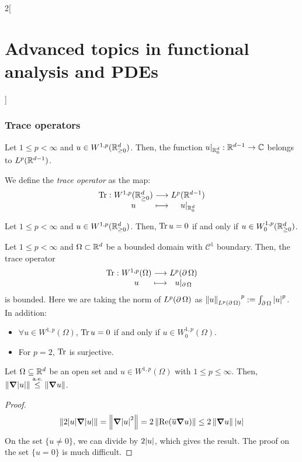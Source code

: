 \documentclass[../../../main_math.tex]{subfiles}
\begin{document}
\begin{multicols}{2}[\section{Advanced topics in functional analysis and PDEs}]
  \subsubsection{Trace operators}
  \begin{theorem}
    Let $1\leq p<\infty$ and $u\in W^{1,p}(\mathbb{R}_{\geq 0}^d)$. Then, the function $u|_{\mathbb{R}_0^d}:\mathbb{R}^{d-1}\to\mathbb{C}$ belongs to $L^p(\mathbb{R}^{d-1})$.
  \end{theorem}
  \begin{definition}
    We define the \emph{trace operator} as the map:
    \begin{align*}
      \function{\Tr}{W^{1,p}(\RR_{\geq 0}^d)}{L^p(\RR^{d-1})}{u}{u|_{\RR_0^d}}
    \end{align*}
  \end{definition}
  \begin{theorem}
    Let $1\leq p<\infty$ and $u\in W^{1,p}(\mathbb{R}_{\geq 0}^d)$. Then, $\Tr u=0$ if and only if $u\in W_0^{1,p}(\mathbb{R}_{\geq 0}^d)$.
  \end{theorem}
  \begin{theorem}\label{ATFAPDE:trace_thm}
    Let $1\leq p<\infty$ and $\Omega\subset\mathbb{R}^d$ be a bounded domain with $\mathcal{C}^1$ boundary. Then, the trace operator
    $$
      \function{\Tr}{W^{1,p}(\Omega)}{L^p(\Fr{\Omega})}{u}{u|_{\Fr{\Omega}}}
    $$
    is bounded. Here we are taking the norm of $L^p(\operatorname{\partial}{\Omega})$ as ${\left\|u\right\|_{L^p(\operatorname{\partial}{\Omega})}}^p:=\int_{\operatorname{\partial}{\Omega}}{\abs{u}^p}$. In addition:
    \begin{itemize}
      \item $\forall u\in W^{1,p}(\Omega)$, $\Tr u=0$ if and only if $u\in W_0^{1,p}(\Omega)$.
      \item For $p=2$, $\Tr$ is surjective.
    \end{itemize}
  \end{theorem}
  \begin{lemma}
    Let $\Omega\subseteq \mathbb{R}^d$ be an open set and $u\in W^{1,p}(\Omega)$ with $1\leq p\leq \infty$. Then, $\left\|\grad \abs{u}\right\|\overset{\text{a.e.}}{\leq}\left\|\grad u\right\|$.
  \end{lemma}
  \begin{proof}
    $$
      \left\|2\abs{u}\grad\abs{u}\right\|=\left\|\grad \abs{u}^2\right\|=2\left\|\Re(\overline{u}\grad u)\right\|\leq 2\left\|\grad u\right\|\abs{u}
    $$
    On the set $\{u\ne 0\}$, we can divide by $2\abs{u}$, which gives the result. The proof on the set $\{u=0\}$ is much difficult.
  \end{proof}
\end{multicols}
\end{document}

